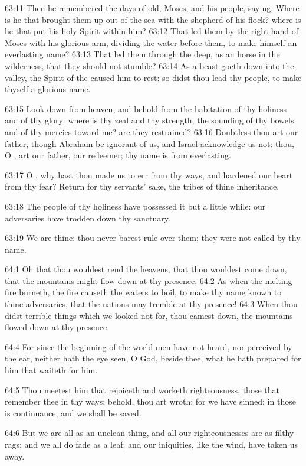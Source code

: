 63:11 Then he remembered the days of old, Moses, and his people,
saying, Where is he that brought them up out of the sea with the
shepherd of his flock? where is he that put his holy Spirit within
him?  63:12 That led them by the right hand of Moses with his glorious
arm, dividing the water before them, to make himself an everlasting
name?  63:13 That led them through the deep, as an horse in the
wilderness, that they should not stumble?  63:14 As a beast goeth down
into the valley, the Spirit of the \LORD caused him to rest: so didst
thou lead thy people, to make thyself a glorious name.

63:15 Look down from heaven, and behold from the habitation of thy
holiness and of thy glory: where is thy zeal and thy strength, the
sounding of thy bowels and of thy mercies toward me? are they
restrained?  63:16 Doubtless thou art our father, though Abraham be
ignorant of us, and Israel acknowledge us not: thou, O \LORD, art our
father, our redeemer; thy name is from everlasting.

63:17 O \LORD, why hast thou made us to err from thy ways, and hardened
our heart from thy fear? Return for thy servants' sake, the tribes of
thine inheritance.

63:18 The people of thy holiness have possessed it but a little while:
our adversaries have trodden down thy sanctuary.

63:19 We are thine: thou never barest rule over them; they were not
called by thy name.

64:1 Oh that thou wouldest rend the heavens, that thou wouldest come
down, that the mountains might flow down at thy presence, 64:2 As when
the melting fire burneth, the fire causeth the waters to boil, to make
thy name known to thine adversaries, that the nations may tremble at
thy presence!  64:3 When thou didst terrible things which we looked
not for, thou camest down, the mountains flowed down at thy presence.

64:4 For since the beginning of the world men have not heard, nor
perceived by the ear, neither hath the eye seen, O God, beside thee,
what he hath prepared for him that waiteth for him.

64:5 Thou meetest him that rejoiceth and worketh righteousness, those
that remember thee in thy ways: behold, thou art wroth; for we have
sinned: in those is continuance, and we shall be saved.

64:6 But we are all as an unclean thing, and all our righteousnesses
are as filthy rags; and we all do fade as a leaf; and our iniquities,
like the wind, have taken us away.

